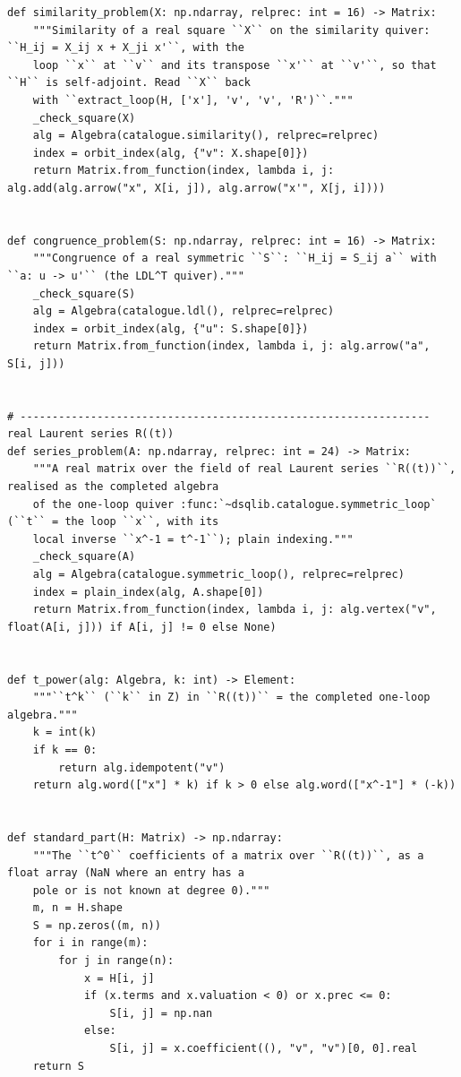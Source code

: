 \documentclass[12pt, a4paper]{report}
\theoremstyle{plain}
\theoremstyle{definition}
\theoremstyle{remark}
\theoremstyle{plain}
\begin{document}
\begin{lstlisting}[style=dsqcode]
def similarity_problem(X: np.ndarray, relprec: int = 16) -> Matrix:
    """Similarity of a real square ``X`` on the similarity quiver: ``H_ij = X_ij x + X_ji x'``, with the
    loop ``x`` at ``v`` and its transpose ``x'`` at ``v'``, so that ``H`` is self-adjoint. Read ``X`` back
    with ``extract_loop(H, ['x'], 'v', 'v', 'R')``."""
    _check_square(X)
    alg = Algebra(catalogue.similarity(), relprec=relprec)
    index = orbit_index(alg, {"v": X.shape[0]})
    return Matrix.from_function(index, lambda i, j: alg.add(alg.arrow("x", X[i, j]), alg.arrow("x'", X[j, i])))


def congruence_problem(S: np.ndarray, relprec: int = 16) -> Matrix:
    """Congruence of a real symmetric ``S``: ``H_ij = S_ij a`` with ``a: u -> u'`` (the LDL^T quiver)."""
    _check_square(S)
    alg = Algebra(catalogue.ldl(), relprec=relprec)
    index = orbit_index(alg, {"u": S.shape[0]})
    return Matrix.from_function(index, lambda i, j: alg.arrow("a", S[i, j]))


# ---------------------------------------------------------------- real Laurent series R((t))
def series_problem(A: np.ndarray, relprec: int = 24) -> Matrix:
    """A real matrix over the field of real Laurent series ``R((t))``, realised as the completed algebra
    of the one-loop quiver :func:`~dsqlib.catalogue.symmetric_loop` (``t`` = the loop ``x``, with its
    local inverse ``x^-1 = t^-1``); plain indexing."""
    _check_square(A)
    alg = Algebra(catalogue.symmetric_loop(), relprec=relprec)
    index = plain_index(alg, A.shape[0])
    return Matrix.from_function(index, lambda i, j: alg.vertex("v", float(A[i, j])) if A[i, j] != 0 else None)


def t_power(alg: Algebra, k: int) -> Element:
    """``t^k`` (``k`` in Z) in ``R((t))`` = the completed one-loop algebra."""
    k = int(k)
    if k == 0:
        return alg.idempotent("v")
    return alg.word(["x"] * k) if k > 0 else alg.word(["x^-1"] * (-k))


def standard_part(H: Matrix) -> np.ndarray:
    """The ``t^0`` coefficients of a matrix over ``R((t))``, as a float array (NaN where an entry has a
    pole or is not known at degree 0)."""
    m, n = H.shape
    S = np.zeros((m, n))
    for i in range(m):
        for j in range(n):
            x = H[i, j]
            if (x.terms and x.valuation < 0) or x.prec <= 0:
                S[i, j] = np.nan
            else:
                S[i, j] = x.coefficient((), "v", "v")[0, 0].real
    return S
\end{lstlisting}
\end{document}

